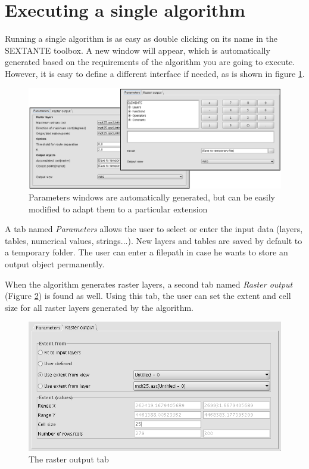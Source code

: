 \documentclass[12pt,a4paper,twocolumn]{article}
\begin{document}
\section{Executing a single algorithm}

Running a single algorithm is as easy as double clicking on its name in the SEXTANTE toolbox. A new window will appear, which is automatically generated based on the requirements of the algorithm you are going to execute. However, it is easy to define a different interface if needed, as is shown in figure \ref{Fig:ParametersWindow}. 

\begin{figure}[!hbt]
 \centering
 \includegraphics[width=.9\textwidth]{ParametersWindow.png} 
\caption{Parameters windows are automatically generated, but can be easily modified to adapt them to a particular extension}
\label{Fig:ParametersWindow}
\end{figure}

A tab named \emph{Parameters} allows the user to select or enter the input data (layers, tables, numerical values, strings...). New layers and tables are saved by default to a temporary folder. The user can enter a filepath in case he wants to store an output object permanently.

When the algorithm generates raster layers, a second tab named \emph{Raster output} (Figure \ref{Fig:RasterOutput}) is found as well. Using this tab, the user can set the extent and cell size for all raster layers generated by the algorithm. 

\begin{figure}[!hbt] 
 \centering
 \includegraphics[width=.5\textwidth]{RasterOutput.png}
\caption{The raster output tab}
\label{Fig:RasterOutput}
\end{figure}
\end{document}
